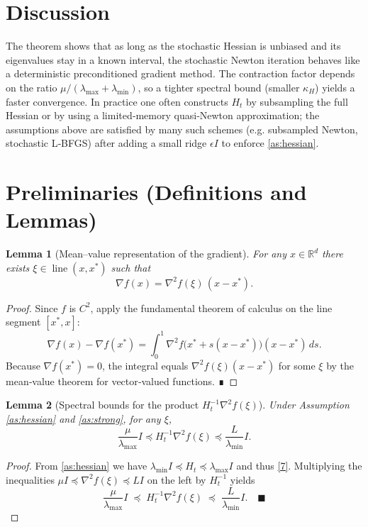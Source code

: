 \documentclass{article}
\newtheorem{lemma}{Lemma}
\newcommand{\R}{\mathbb{R}}
\begin{document}
\section*{Discussion}
The theorem shows that as long as the stochastic Hessian is unbiased and
its eigenvalues stay in a known interval, the stochastic Newton iteration
behaves like a deterministic preconditioned gradient method.  The
contraction factor depends on the ratio $\mu/(\lambda_{\max}+\lambda_{\min})$,
so a tighter spectral bound (smaller $\kappa_H$) yields a faster
convergence.  In practice one often constructs $H_t$ by subsampling the
full Hessian or by using a limited‑memory quasi‑Newton approximation;
the assumptions above are satisfied by many such schemes (e.g. subsampled
Newton, stochastic L‑BFGS) after adding a small ridge $\epsilon I$ to enforce \eqref{as:hessian}.

\newpage

\section*{Preliminaries (Definitions and Lemmas)}
\begin{lemma}[Mean–value representation of the gradient]
\label{lem:meanvalue}
For any $x\in\R^{d}$ there exists $\xi\in\operatorname{line}(x,x^{*})$ such that
\[
\nabla f(x)=\nabla^{2}f(\xi)\,(x-x^{*}).
\tag{8}
\]
\end{lemma}
\begin{proof}
Since $f$ is $C^{2}$, apply the fundamental theorem of calculus on the line
segment $[x^{*},x]$:
\[
\nabla f(x)-\nabla f(x^{*})=\int_{0}^{1}\nabla^{2}f\bigl(x^{*}+s(x-x^{*})\bigr)(x-x^{*})\,ds .
\]
Because $\nabla f(x^{*})=0$, the integral equals $\nabla^{2}f(\xi)(x-x^{*})$
for some $\xi$ by the mean‑value theorem for vector‑valued functions. ∎
\end{proof}

\begin{lemma}[Spectral bounds for the product $H_t^{-1}\nabla^{2}f(\xi)$]
\label{lem:spectral}
Under Assumption \ref{as:hessian} and \ref{as:strong},
for any $\xi$,
\[
\frac{\mu}{\lambda_{\max}} I \preceq H_t^{-1}\nabla^{2}f(\xi)
\preceq \frac{L}{\lambda_{\min}} I .
\tag{9}
\]
\end{lemma}
\begin{proof}
From \eqref{as:hessian} we have $\lambda_{\min}I\preceq H_t\preceq\lambda_{\max}I$
and thus \eqref{7}.  Multiplying the inequalities
$\mu I\preceq\nabla^{2}f(\xi)\preceq L I$ on the left by $H_t^{-1}$ yields
\[
\frac{\mu}{\lambda_{\max}} I
\;\preceq\;
H_t^{-1}\nabla^{2}f(\xi)
\;\preceq\;
\frac{L}{\lambda_{\min}} I .
\quad\blacksquare
\]
\end{proof}
\end{document}
